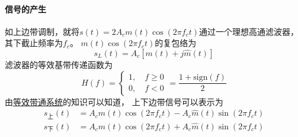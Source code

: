     \paragraph{信号的产生}\mbox{}
    
    如上边带调制，就将$s(t)=2A_cm(t)\cos(2\pi f_ct)$通过一个理想高通滤波器，其下截止频率为$f_c$。
    $m(t)\cos(2\pi f_ct)$的复包络为
    \begin{equation}
        s_L(t)=A_c[m(t)+j\hat{m}(t)]
    \end{equation}
    滤波器的等效基带传递函数为
    \begin{equation}
        H(f)=\left\{
        \begin{aligned}
            1,\hspace{1em}f\geq 0\\
            0,\hspace{1em}f< 0
        \end{aligned}   
        \right.
        =\frac{1+\text{sign}(f)}{2}
    \end{equation}
    由\hyperref[subsec:bandsystem]{等效带通系统}的知识可以知道，
    上下边带信号可以表示为
    \begin{align}
        s_{\text{上}}(t)&=A_cm(t)\cos(2\pi f_ct)-A_c\hat{m}(t)\sin(2\pi f_ct)\\
        s_{\text{下}}(t)&=A_cm(t)\cos(2\pi f_ct)+A_c\hat{m}(t)\sin(2\pi f_ct)
    \end{align}
    
